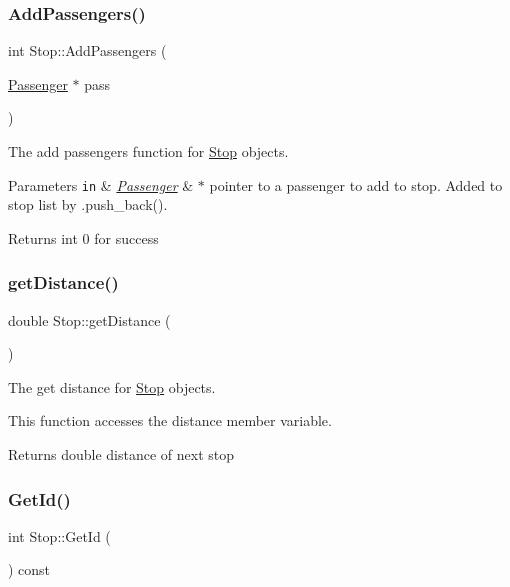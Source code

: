 \subsubsection{\texorpdfstring{Add\+Passengers()}{AddPassengers()}}
{\footnotesize\ttfamily int Stop\+::\+Add\+Passengers (\begin{DoxyParamCaption}\item[{\hyperlink{classPassenger}{Passenger} $\ast$}]{pass }\end{DoxyParamCaption})}



The add passengers function for \hyperlink{classStop}{Stop} objects. 


\begin{DoxyParams}[1]{Parameters}
\mbox{\tt in}  & {\em \hyperlink{classPassenger}{Passenger}} & $\ast$ pointer to a passenger to add to stop. Added to stop list by .push\+\_\+back().\\
\hline
\end{DoxyParams}
\begin{DoxyReturn}{Returns}
int 0 for success 
\end{DoxyReturn}
\mbox{\label{classStop_a75185ff04f33083582c98230fc3a6df4}} 
\subsubsection{\texorpdfstring{get\+Distance()}{getDistance()}}
{\footnotesize\ttfamily double Stop\+::get\+Distance (\begin{DoxyParamCaption}{ }\end{DoxyParamCaption})}



The get distance for \hyperlink{classStop}{Stop} objects. 

This function accesses the distance member variable.

\begin{DoxyReturn}{Returns}
double distance of next stop 
\end{DoxyReturn}
\mbox{\label{classStop_a2f3b845d5a338f197226c90696314904}} 
\subsubsection{\texorpdfstring{Get\+Id()}{GetId()}}
{\footnotesize\ttfamily int Stop\+::\+Get\+Id (\begin{DoxyParamCaption}{ }\end{DoxyParamCaption}) const}



